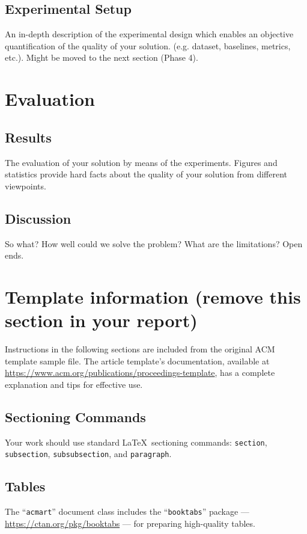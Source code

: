 \documentclass[sigconf]{acmart}
\begin{document}
\subsection{Experimental Setup}
An in-depth description of the experimental design which enables an objective quantification of the quality of your solution. (e.g. dataset, baselines, metrics, etc.).
Might be moved to the next section (Phase 4).

\section{Evaluation}
\subsection{Results}
The evaluation of your solution by means of the experiments. 
Figures and statistics provide hard facts about the quality of your solution from different viewpoints.

\subsection{Discussion}
So what? 
How well could we solve the problem? 
What are the limitations? 
Open ends.


\section*{Template information (remove this section in your report)}
\label{sec:template-information}
Instructions in the following sections are included from the original ACM template sample file.
The article template's documentation, available at
\url{https://www.acm.org/publications/proceedings-template}, has a
complete explanation and tips for effective use.

\subsection*{Sectioning Commands}

Your work should use standard \LaTeX\ sectioning commands:
\verb|section|, \verb|subsection|, \verb|subsubsection|, and
\verb|paragraph|. 

\subsection*{Tables}

The ``\verb|acmart|'' document class includes the ``\verb|booktabs|''
package --- \url{https://ctan.org/pkg/booktabs} --- for preparing
high-quality tables.
\end{document}
